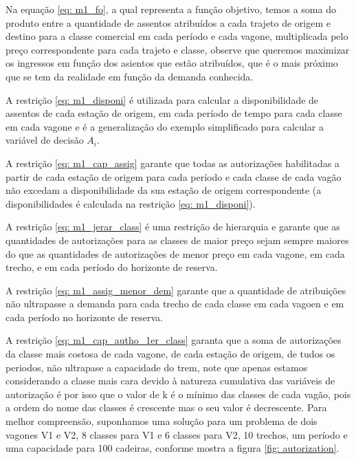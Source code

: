 Na equação \ref{eq: m1_fo}, a qual representa a função objetivo, temos a soma do produto entre a quantidade de assentos atribuídos a cada trajeto de origem e destino para a classe comercial em cada período e cada vagone, multiplicada pelo preço correspondente para cada trajeto e classe, observe que queremos maximizar os ingressos em função dos asientos que estão atribuídos, que é o mais próximo que se tem da realidade em função da demanda conhecida.

A restrição \ref{eq: m1_disponi} é utilizada para calcular a disponibilidade de assentos de cada estação de origem, em cada período de tempo para cada classe em cada vagone e é a generalização do exemplo simplificado para calcular a variável de decisão $A_i$.

A restrição \ref{eq: m1_cap_assig} garante que todas as autorizações habilitadas a partir de cada estação de origem para cada período e cada classe de cada vagão não excedam a disponibilidade da sua estação de origem correspondente (a disponibilidades é calculada na restrição \ref{eq: m1_disponi}).

A restrição \ref{eq: m1_jerar_class} é uma restrição de hierarquia e garante que as quantidades de autorizações para as classes de maior preço sejam sempre maiores do que as quantidades de autorizações de menor preço em cada vagone, em cada trecho, e em  cada período do horizonte de reserva.

A restrição \ref{eq: m1_assig_menor_dem} garante que a quantidade de atribuições não ultrapasse a demanda para cada trecho de cada classe em cada vagoen e em cada período no horizonte de reserva.

A restrição \ref{eq: m1_cap_autho_1er_class} garanta que a soma de autorizações da classe mais costosa de cada vagone, de cada estação de origem, de tudos os periodos, não ultrapase a capacidade do trem, note que apenas estamos considerando a classe mais cara devido à natureza cumulativa das variáveis de autorização é por isso que o valor de k é o mínimo das classes de cada vagão, pois a ordem do nome das classes é crescente mas o seu valor é decrescente. Para melhor compreensão, suponhamos uma solução para um problema de dois vagones V1 e V2, 8 classes para V1 e 6 classes para V2, 10 trechos, um período e uma capacidade para 100 cadeiras, conforme mostra a figura \ref{fig: autorization}.

